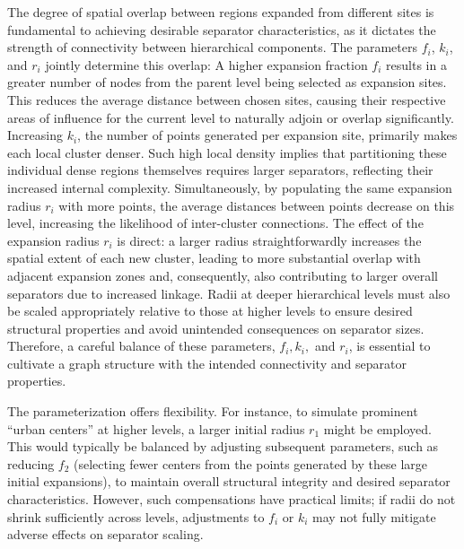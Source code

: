 The degree of spatial overlap between regions expanded from different sites is fundamental to achieving desirable separator characteristics, as it dictates the strength of connectivity between hierarchical components.
The parameters \(f_i\), \(k_i\), and \(r_i\) jointly determine this overlap:
A higher expansion fraction \(f_i\) results in a greater number of nodes from the parent level being selected as expansion sites.
This reduces the average distance between chosen sites, causing their respective areas of influence for the current level to naturally adjoin or overlap significantly.
Increasing \(k_i\), the number of points generated per expansion site, primarily makes each local cluster denser.
Such high local density implies that partitioning these individual dense regions themselves requires larger separators, reflecting their increased internal complexity.
Simultaneously, by populating the same expansion radius \(r_i\) with more points, the average distances between points decrease on this level, increasing the likelihood of inter-cluster connections.
The effect of the expansion radius \(r_i\) is direct: a larger radius straightforwardly increases the spatial extent of each new cluster, leading to more substantial overlap with adjacent expansion zones and, consequently, also contributing to larger overall separators due to increased linkage.
Radii at deeper hierarchical levels must also be scaled appropriately relative to those at higher levels to ensure desired structural properties and avoid unintended consequences on separator sizes.
Therefore, a careful balance of these parameters, \(f_i, k_i,\) and \(r_i\), is essential to cultivate a graph structure with the intended connectivity and separator properties.

The parameterization offers flexibility.
For instance, to simulate prominent \enquote{urban centers} at higher levels, a larger initial radius \(r_1\) might be employed.
This would typically be balanced by adjusting subsequent parameters, such as reducing \(f_2\) (selecting fewer centers from the points generated by these large initial expansions), to maintain overall structural integrity and desired separator characteristics.
However, such compensations have practical limits; if radii do not shrink sufficiently across levels, adjustments to \(f_i\) or \(k_i\) may not fully mitigate adverse effects on separator scaling.

